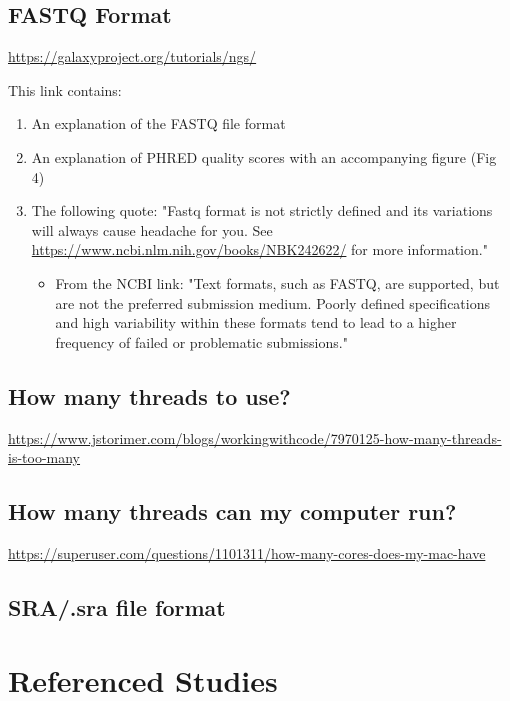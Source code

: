 \begin{fullpage}
    
    \section{FASTQ Format}
    \label{app:fastq-format}
    \url{https://galaxyproject.org/tutorials/ngs/}
    
    This link contains:
    \begin{enumerate}
    \item An explanation of the FASTQ file format
    \item An explanation of PHRED quality scores with an accompanying figure (Fig 4)
    \item The following quote: "Fastq format is not strictly defined and its variations will always cause headache for you. See \url{https://www.ncbi.nlm.nih.gov/books/NBK242622/} for more information."
        \begin{itemize}
        \item From the NCBI link: "Text formats, such as FASTQ, are supported, but are not the preferred submission medium. Poorly defined specifications and high variability within these formats tend to lead to a higher frequency of failed or problematic submissions."
        \end{itemize}    
    \end{enumerate}
    
    
    \section{How many threads to use?}
    \label{app:threads}
    \url{https://www.jstorimer.com/blogs/workingwithcode/7970125-how-many-threads-is-too-many}
    
    
    \section{How many threads can my computer run?}
    \label{app:threads-resources}
    \url{https://superuser.com/questions/1101311/how-many-cores-does-my-mac-have}


    \section{SRA/.sra file format}
    \label{app:sra-format}

    
\chapter{Referenced Studies}


\end{fullpage}
%

